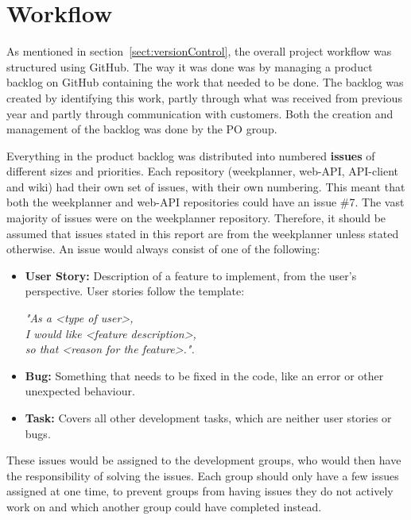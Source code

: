 \section{Workflow}
\label{sect:workOrganization}
As mentioned in section~\ref{sect:versionControl}, the overall project workflow was structured using GitHub. The way it was done was by managing a product backlog on GitHub containing the work that needed to be done. The backlog was created by identifying this work, partly through what was received from previous year and partly through communication with customers. Both the creation and management of the backlog was done by the PO group. 

Everything in the product backlog was distributed into numbered \textbf{issues} of different sizes and priorities. Each repository (weekplanner, web-API, API-client and wiki) had their own set of issues, with their own numbering. This meant that both the weekplanner and web-API repositories could have an issue \#7. The vast majority of issues were on the weekplanner repository. Therefore, it should be assumed that issues stated in this report are from the weekplanner unless stated otherwise.
An issue would always consist of one of the following:

\begin{itemize}
    \item \textbf{User Story:} Description of a feature to implement, from the user's perspective. User stories follow the template:\\\newline
        \begin{minipage}{.5\linewidth}
        \textit{"As a <type of user>,\\}
        \textit{I would like <feature description>,\\}
        \textit{so that <reason for the feature>.".\\}
        \end{minipage}
    \item \textbf{Bug:} Something that needs to be fixed in the code, like an error or other unexpected behaviour.
    \item \textbf{Task:} Covers all other development tasks, which are neither user stories or bugs.
\end{itemize}

These issues would be assigned to the development groups, who would then have the responsibility of solving the issues. 
Each group should only have a few issues assigned at one time, to prevent groups from having issues they do not actively work on and which another group could have completed instead. 

